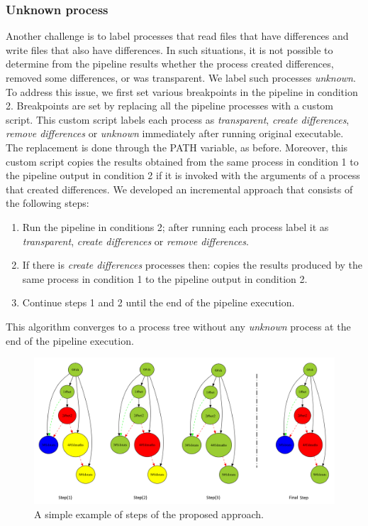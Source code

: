 \documentclass[a4paper,num-refs]{oup-contemporary}
\begin{document}
\subsubsection{Unknown process} 

Another challenge is to label processes that read files that have 
differences and write files that also have differences. In such 
situations, it is not possible to determine from the pipeline results 
whether the process created differences, removed some differences, or 
was transparent. We label such processes \emph{unknown}.
To address this issue, we first set various breakpoints in the pipeline 
in condition 2. Breakpoints are set by replacing all the pipeline 
processes with a custom script. This custom script labels each process 
as \emph{transparent}, \emph{create differences}, \emph{remove 
differences} or \emph{unknown} immediately after running original executable. 
The replacement is done through the PATH variable, as before. Moreover, 
this custom script copies the results obtained from the same process in 
condition 1 to the pipeline output in condition 2 if it is invoked with 
the arguments of a process that created differences. 
We developed an incremental approach that consists of the following steps: 

\begin{enumerate}
  \item Run the pipeline in conditions 2; after running each process 
  label it as \emph{transparent}, \emph{create differences} or
  \emph{remove differences}.
  
  \item If there is \emph{create differences} processes then: 
  copies the results produced by the same process in condition 1 to the 
  pipeline output in condition 2. 
  
  \item Continue steps 1 and 2 until the end of the pipeline execution.
\end{enumerate}

This algorithm converges to a process tree without any 
\emph{unknown} process at the end of the pipeline execution.

\begin{figure}
  \centering
  \includegraphics[width=\columnwidth]{images/iterative_modif}
  \caption{A simple example of steps of the proposed approach.}
  \label{fig:iterations}
\end{figure}
\end{document}

